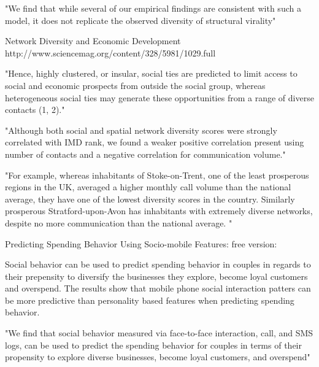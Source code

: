 {"We find that while several of our empirical findings are consistent with such a model, it does not replicate the observed diversity of structural virality"











Network Diversity and Economic Development
http://www.sciencemag.org/content/328/5981/1029.full



"Hence, highly clustered, or insular, social ties are predicted to limit access to social and economic prospects from outside the social group, whereas heterogeneous social ties may generate these opportunities from a range of diverse contacts (1, 2)."

"Although both social and spatial network diversity scores were strongly correlated with IMD rank, we found a weaker positive correlation present using number of contacts and a negative correlation for communication volume."

"For example, whereas inhabitants of Stoke-on-Trent, one of the least prosperous regions in the UK, averaged a higher monthly call volume than the national average, they have one of the lowest diversity scores in the country. Similarly prosperous Stratford-upon-Avon has inhabitants with extremely diverse networks, despite no more communication than the national average. "




Predicting Spending Behavior Using Socio-mobile Features:
free version:

Social behavior can be used to predict spending behavior in couples in regards to their prepensity to diversify the businesses they explore, become loyal customers and overspend. The results show that mobile phone social interaction patters can be more predictive than personality based features when predicting spending behavior. 

"We find that social behavior measured via face-to-face interaction, call, and SMS logs, can be used to predict the spending behavior for couples in terms of their propensity to explore diverse businesses, become loyal customers, and overspend"

}

